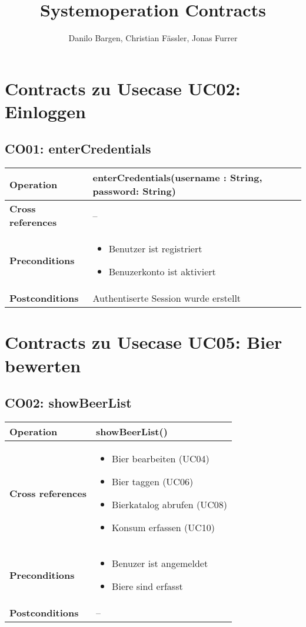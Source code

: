 \documentclass[10pt,a4paper]{scrartcl}
\author{Danilo Bargen, Christian Fässler, Jonas Furrer}
\title{Systemoperation Contracts}
\begin{document}
\begin{titlepage}
	\maketitle
	\vspace{120mm}
	\thispagestyle{empty} %
\end{titlepage}

\section{Contracts zu Usecase UC02: Einloggen}
\subsection{CO01: enterCredentials}
\begin{tabular}{|l|p{}|}
\hline
 \textbf{Operation} & enterCredentials(username : String, password: String) \\ 
\hline
\textbf{Cross references} & -- \\ 
\hline 
\textbf{Preconditions} & \begin{itemize} 
							\item Benutzer ist registriert
							\item Benuzerkonto ist aktiviert 
						  \end{itemize}\\
\hline 
\textbf{Postconditions} & Authentiserte Session wurde erstellt \\
\hline
\end{tabular}

\section{Contracts zu Usecase UC05: Bier bewerten}
\subsection{CO02: showBeerList}
\begin{tabular}{|l|p{}|}
\hline
 \textbf{Operation} & showBeerList() \\ 
\hline
\textbf{Cross references} & \begin{itemize}
								\item Bier bearbeiten (UC04)
								\item Bier taggen (UC06)
								\item Bierkatalog abrufen (UC08)
								\item Konsum erfassen (UC10)
							\end{itemize} \\ 
\hline 
\textbf{Preconditions} & \begin{itemize}
							\item Benuzer ist angemeldet
							\item Biere sind erfasst 
						 \end{itemize}\\
\hline 
\textbf{Postconditions} & -- \\
\hline
\end{tabular}
\end{document}
